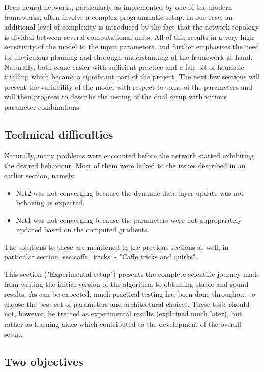\documentclass[a4paper, 12pt]{article}
\numberwithin{equation}{section}
\begin{document}
	Deep neural networks, particularly as implemented by one of the modern frameworks, often involve a complex programmatic setup. In our case, an additional level of complexity is introduced by the fact that the network topology is divided between several computational units. All of this results in a very high sensitivity of the model to the input parameters, and further emphasises the need for meticulous planning and thorough understanding of the framework at hand. Naturally, both come easier with sufficient practice and a fair bit of heuristic trialling which became a significant part of the project. The next few sections will present the variability of the model with respect to some of the parameters and will then progress to describe the testing of the dual setup with various parameter combinations.
	
	\subsection{Technical difficulties}
	
	Naturally, many problems were encounted before the network started exhibiting the desired behaviour. Most of them were linked to the issues described in an earlier section, namely:
	
	\begin{itemize}
		\item Net2 was not converging because the dynamic data layer update was not behaving as expected.
		\item Net1 was not converging because the parameters were not appropriately updated based on the computed gradients.
	\end{itemize}
	
	The solutions to these are mentioned in the previous sections as well, in particular section \ref{sec:caffe_tricks} - "Caffe tricks and quirks". 
	
	This section ("Experimental setup") presents the complete scientific journey made from writing the initial version of the algorithm to obtaining stable and sound results. As can be expected, much practical testing has been done throughout to choose the best set of parameters and architectural choices. These tests should not, however, be treated as experimental results (explained much later), but rather as learning aides which contributed to the development of the overall setup.
	
	\subsection{Two objectives}
	
\end{document}
